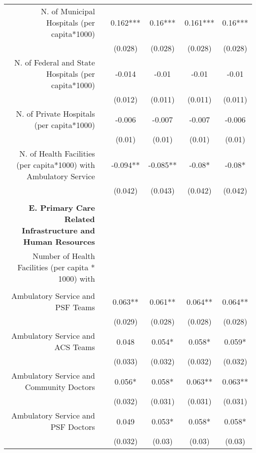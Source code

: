 \begin{table}[h]
\begin{footnotesize}
\begin{center}
{\begin{threeparttable}[b]
\begin{tabular}{rrcccc}
    \multicolumn{1}{p{29.785em}}{N. of Municipal Hospitals (per capita*1000)} &       & 0.162*** & 0.16*** & 0.161*** &  0.16***  \\
          &       & (0.028) & (0.028) & (0.028) &  (0.028)  \\
    \multicolumn{1}{p{29.785em}}{N. of Federal and State Hospitals (per capita*1000)} &       & -0.014 & -0.01 & -0.01 &  -0.01  \\
          &       & (0.012) & (0.011) & (0.011) &  (0.011)  \\
    \multicolumn{1}{p{29.785em}}{N. of Private Hospitals (per capita*1000)} &       & -0.006 & -0.007 & -0.007 &  -0.006  \\
          &       & (0.01) & (0.01) & (0.01) &  (0.01)  \\
    \multicolumn{1}{p{29.785em}}{N. of Health Facilities (per capita*1000) with Ambulatory Service} &       & -0.094** & -0.085** & -0.08* &  -0.08*  \\
          &       & (0.042) & (0.043) & (0.042) &  (0.042)  \\
          &       &       &       &       &  \\
    \midrule
    \multicolumn{1}{p{29.785em}}{\textbf{E. Primary Care Related Infrastructure and Human Resources}} &       &       &       &       &  \\
    \multicolumn{1}{p{29.785em}}{Number of Health Facilities (per capita * 1000) with} &       &       &       &       &  \\
          &       &       &       &       &  \\
    \multicolumn{1}{p{29.785em}}{Ambulatory Service and PSF Teams} &       & 0.063** & 0.061** & 0.064** &  0.064**  \\
          &       & (0.029) & (0.028) & (0.028) &  (0.028)  \\
    \multicolumn{1}{p{29.785em}}{Ambulatory Service and ACS Teams} &       & 0.048 & 0.054* & 0.058* &  0.059*  \\
          &       & (0.033) & (0.032) & (0.032) &  (0.032)  \\
    \multicolumn{1}{p{29.785em}}{Ambulatory Service and Community Doctors} &       & 0.056* & 0.058* & 0.063** &  0.063**  \\
          &       & (0.032) & (0.031) & (0.031) &  (0.031)  \\
    \multicolumn{1}{p{29.785em}}{Ambulatory Service and PSF Doctors} &       & 0.049 & 0.053* & 0.058* &  0.058*  \\
          &       & (0.032) & (0.03) & (0.03) &  (0.03)  \\

\end{tabular}
\end{threeparttable}}
\end{center}
\end{footnotesize}
\end{table}
